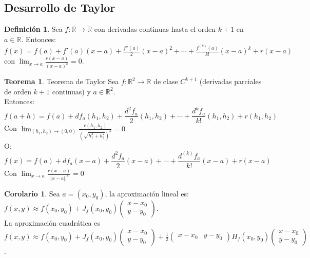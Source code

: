 \documentclass[10pt]{article}
\theoremstyle{definition}
\newtheorem{definition}{Definición}[section]
\newtheorem{theorem}{Teorema}[section]
\newtheorem{corollary}{Corolario}[theorem]
\begin{document}
\subsection{Desarrollo de Taylor}
\begin{definition}
Sea $f:\mathbb{R}\to\mathbb{R}$ con derivadas continuas hasta el orden $k+1$ en $a\in\mathbb{R}$. Entonces:\\
$f(x)=f(a)+f'(a)(x-a)+\frac{f''(a)}{2}(x-a)^2+\cdots+\frac{f^{(k)}(a)}{k!}(x-a)^k+r(x-a)$ con $\lim_{x \to a}\frac{r(x-a)}{(x-a)^k}=0$.
\end{definition}
\begin{theorem}{Teorema de Taylor}
    Sea $f:\mathbb{R}^2\to\mathbb{R}$ de clase $C^{k+1}$ (derivadas parciales de orden $k+1$ continuas) y $a\in\mathbb{R}^2$.
    \\Entonces:$$f(a+h)=f(a)+df_a(h_1,h_2)+\frac{d^2f_a}{2}(h_1,h_2)+\cdots+\frac{d^kf_a}{k!}(h_1,h_2)+r(h_1,h_2)$$
    Con $\lim_{(h_1,h_2) \to (0,0)}\frac{r(h_1,h_2)}{(\sqrt{h_1^2+h_2^2})^k}=0$
    \\O: $$f(x)=f(a)+df_a(x-a)+\frac{d^2f_a}{2}(x-a)+\cdots+\frac{d^{(k)}f_a}{k!}(x-a)+r(x-a)$$
    Con $\lim_{x \to a}\frac{r(x-a)}{||x-a||^k}=0$
\end{theorem}
\begin{corollary}
    Sea $a=(x_0,y_0)$, la aproximación lineal es: $f(x,y)\approx f(x_0,y_0)+J_f(x_0,y_0)\begin{pmatrix} x-x_0\\y-y_0 \end{pmatrix} $.
    \\La aproximación cuadrática es $f(x,y)\approx f(x_0,y_0)+J_f(x_0,y_0) \begin{pmatrix} x-x_0 \\ y-y_0 \end{pmatrix}+\frac{1}{2} \begin{pmatrix} x-x_0 & y-y_0 \end{pmatrix} H_f(x_0,y_0) \begin{pmatrix} x-x_0 \\ y-y_0 \end{pmatrix}  $.
\end{corollary}\newpage
\end{document}
